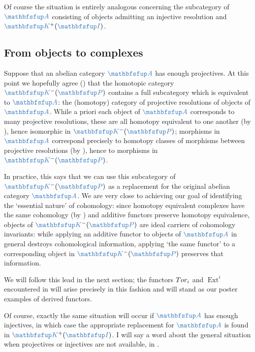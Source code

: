 Of course the situation is entirely analogous concerning the
subcategory of $\categ{A}$ consisting of objects admitting an
injective resolution and $\categ{K}^+(\categ{I})$.

\subsection{From objects to complexes}
\label{subsec:homol:from-objects-to-complexes}

Suppose that an abelian category $\categ{A}$ has enough projectives.
At this point we hopefully agree
() that the
homotopic category $\categ{K}^-(\categ{P})$ contains a full
subcategory which is equivalent to $\categ{A}$: the (homotopy)
category of projective resolutions of objects of $\categ{A}$. While a
priori each object of $\categ{A}$ corresponds to many projective
resolutions, these are all homotopy equivalent to one another (by
), hence isomorphic in
$\categ{K}^-(\categ{P})$; morphisms in $\categ{A}$ correspond
precisely to homotopy classes of morphisms between projective
resolutions (by ), hence to morphisms
in $\categ{K}^-(\categ{P})$.

In practice, this says that we can use this subcategory of
$\categ{K}^-(\categ{P})$ as a replacement for the original abelian
category $\categ{A}$. We are very close to achieving our goal of
identifying the `essential nature' of cohomology: since homotopy
equivalent complexes have the same cohomology (by )
and additive functors preserve homotopy equivalence, objects of
$\categ{K}^-(\categ{P})$ are ideal carriers of cohomology invariants:
while applying an additive functor to objects of $\categ{A}$ in
general destroys cohomological information, applying `the same
functor' to a corresponding object in $\categ{K}^-(\categ{P})$
preserves that information.

We will follow this lead in the next section; the functors $Tor_i$
and $\operatorname{Ext}^i$ encountered in  will
arise precisely in this fashion and will stand as our poster examples
of derived functors.

Of course, exactly the same situation will occur if $\categ{A}$ has
enough injectives, in which case the appropriate replacement for
$\categ{A}$ is found in $\categ{K}^+(\categ{I})$. I will say a word
about the general situation when projectives or injectives are not
available, in .

